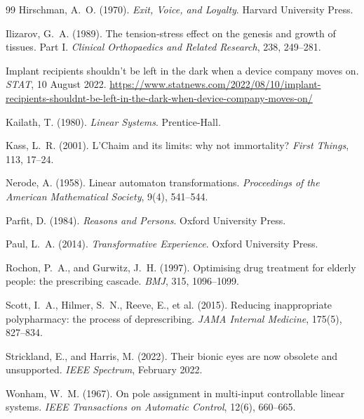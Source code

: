 \documentclass[11pt]{article}
\theoremstyle{plain}
\theoremstyle{definition}
\theoremstyle{remark}
\begin{document}
\begin{thebibliography}{99}
 Hirschman, A.~O. (1970). \emph{Exit, Voice, and Loyalty}. Harvard University Press.

 Ilizarov, G.~A. (1989). The tension-stress effect on the genesis and growth of tissues. Part I. \emph{Clinical Orthopaedics and Related Research}, 238, 249--281.

 Implant recipients shouldn't be left in the dark when a device company moves on. \emph{STAT}, 10 August 2022. \url{https://www.statnews.com/2022/08/10/implant-recipients-shouldnt-be-left-in-the-dark-when-device-company-moves-on/}

 Kailath, T. (1980). \emph{Linear Systems}. Prentice-Hall.

 Kass, L.~R. (2001). L'Chaim and its limits: why not immortality? \emph{First Things}, 113, 17--24.

 Nerode, A. (1958). Linear automaton transformations. \emph{Proceedings of the American Mathematical Society}, 9(4), 541--544.

 Parfit, D. (1984). \emph{Reasons and Persons}. Oxford University Press.

 Paul, L.~A. (2014). \emph{Transformative Experience}. Oxford University Press.

 Rochon, P.~A., and Gurwitz, J.~H. (1997). Optimising drug treatment for elderly people: the prescribing cascade. \emph{BMJ}, 315, 1096--1099.

 Scott, I.~A., Hilmer, S.~N., Reeve, E., et al. (2015). Reducing inappropriate polypharmacy: the process of deprescribing. \emph{JAMA Internal Medicine}, 175(5), 827--834.

 Strickland, E., and Harris, M. (2022). Their bionic eyes are now obsolete and unsupported. \emph{IEEE Spectrum}, February 2022.

 Wonham, W.~M. (1967). On pole assignment in multi-input controllable linear systems. \emph{IEEE Transactions on Automatic Control}, 12(6), 660--665.

\end{thebibliography}
\end{document}
